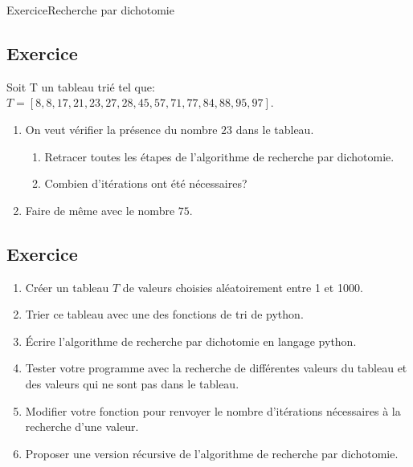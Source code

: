 \documentclass[11pt,a4paper]{article}
\newcounter{numexo}
\begin{document}
\begin{NSI}
{Exercice}{Recherche par dichotomie}
\end{NSI}


%


\addtocounter{numexo}{1}
\subsection*{\Large Exercice \thenumexo}
Soit T un tableau trié tel que: $T=[8, 8, 17, 21, 23, 27, 28, 45, 57, 71, 77, 84, 88, 95, 97]$.
\begin{enumerate}
\item On veut vérifier la présence du nombre $23$ dans le tableau.
\begin{enumerate}
\item Retracer toutes les étapes de l'algorithme de recherche par dichotomie.
\item Combien d'itérations ont été nécessaires?
\end{enumerate}
\item Faire de même avec le nombre $75$.
\end{enumerate}


\addtocounter{numexo}{1}
\subsection*{\Large Exercice \thenumexo}

\begin{enumerate}
\item Créer un tableau $T$ de valeurs choisies aléatoirement entre 1 et 1000.
\item Trier ce tableau avec une des fonctions de tri de python.
\item Écrire l'algorithme de recherche par dichotomie en langage python.
\item Tester votre programme avec la recherche de différentes valeurs du tableau et des valeurs qui ne sont pas dans le tableau.

\item Modifier votre fonction pour renvoyer le nombre d'itérations nécessaires à la recherche d'une valeur.
\item Proposer une version récursive de l'algorithme de recherche par dichotomie.
\end{enumerate}
\end{document}
